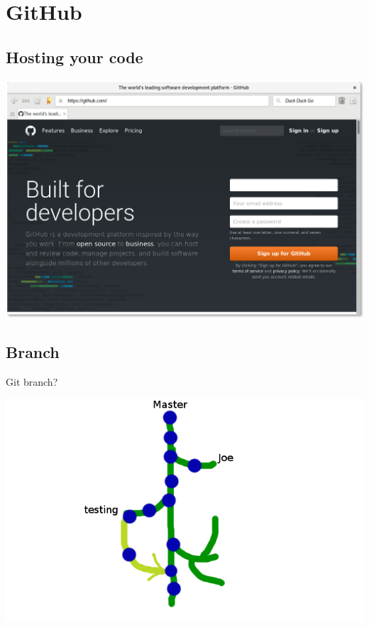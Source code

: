 \documentclass[10pt]{beamer}
\begin{document}
\section{GitHub}
\label{sec:org6b52598}
\subsection{Hosting your code}
\label{sec:org1adde17}

\begin{center}
\includegraphics[width=.9\linewidth]{./github.png}
\end{center}

\subsection{Branch}
\label{sec:orgef91365}
\begin{frame}[label={sec:org77a22a4}]{Git branch?}
\begin{center}
\includegraphics[width=.9\linewidth]{./branch.png}
\end{center}
\end{frame}
\end{document}
